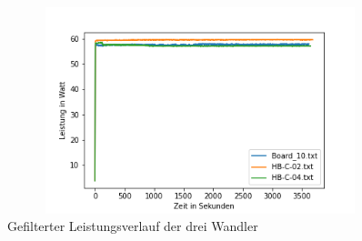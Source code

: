 \begin{figure}[H]
    \centering
    \includegraphics[height= 6cm, width = 12cm]{Pictures/3_Board_Leistung_Filtered.png}
    \caption{Gefilterter Leistungsverlauf der drei Wandler}
\end{figure}

